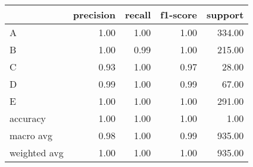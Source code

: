 \begin{tabular}{|l|r|r|r|r|}
\hline
{} &  precision &  recall &  f1-score &  support \\
\hline
A            &       1.00 &    1.00 &      1.00 &   334.00 \\
B            &       1.00 &    0.99 &      1.00 &   215.00 \\
C            &       0.93 &    1.00 &      0.97 &    28.00 \\
D            &       0.99 &    1.00 &      0.99 &    67.00 \\
E            &       1.00 &    1.00 &      1.00 &   291.00 \\
accuracy     &       1.00 &    1.00 &      1.00 &     1.00 \\
macro avg    &       0.98 &    1.00 &      0.99 &   935.00 \\
weighted avg &       1.00 &    1.00 &      1.00 &   935.00 \\
\hline
\end{tabular}
